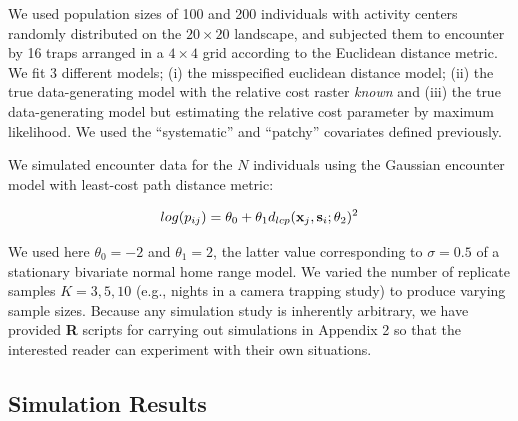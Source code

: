We used population sizes of 100 and 200 individuals with activity
centers randomly distributed on the $20 \times 20$ landscape, and subjected them
to encounter by 16 traps arranged in a $4\times 4$ grid according to
the Euclidean distance metric. We fit 3 different models; (i) the
misspecified euclidean distance model; (ii) the true data-generating
model with the relative cost raster {\it known} and (iii) the true
data-generating model but estimating the relative cost parameter by
maximum likelihood.  We used the ``systematic'' and ``patchy''
covariates defined previously.

We simulated encounter data for the $N$ individuals using the Gaussian
encounter model with least-cost path distance metric:

\[
log(p_{ij})= \theta_{0} + \theta_{1} d_{lcp}({\bf x}_{j},{\bf
  s}_{i}; \theta_{2})^{2}
\]

{\flushleft We } used here $\theta_{0} = -2$ and $\theta_{1} = 2$, the latter value
corresponding to $\sigma = 0.5$ of a stationary bivariate normal home
range model.  We varied the number of replicate samples $K=3,5,10$
(e.g., nights in a camera trapping study) to produce varying sample
sizes.  Because any simulation study is inherently arbitrary, we have
provided {\bf R} scripts for carrying out simulations in Appendix 2 so
that the interested reader can experiment with their own situations.
















































\subsection{Simulation Results}

